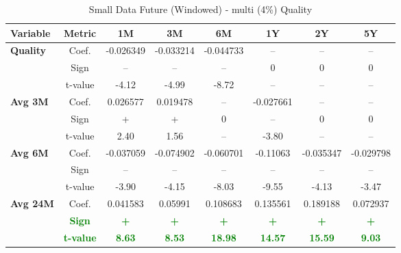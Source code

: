 \documentclass[11pt,english,a4paper,hidelinks]{book}
\begin{document}
\begin{table}[H]
    \centering
    \begin{tabular}{lccccccc}
        \toprule
        \textbf{Variable} & \textbf{Metric} & \textbf{1M} & \textbf{3M} & \textbf{6M} & \textbf{1Y} & \textbf{2Y} & \textbf{5Y} \\
        \midrule
        \multirow{3}{*}{\textbf{Quality}}
            & Coef.   & -0.026349 & -0.033214 & -0.044733 & --        & --        & --        \\
            & Sign    & –         & –         & –         & 0         & 0         & 0         \\
            & t-value & -4.12     & -4.99     & -8.72     & --        & --        & --        \\
        \cmidrule{1-8}
        \multirow{3}{*}{\textbf{Avg 3M}}
            & Coef.   & 0.026577  & 0.019478  & --        & -0.027661 & --        & --        \\
            & Sign    & +         & +         & 0         & –         & 0         & 0         \\
            & t-value & 2.40      & 1.56      & --        & -3.80     & --        & --        \\
        \cmidrule{1-8}
        \multirow{3}{*}{\textbf{Avg 6M}}
            & Coef.   & -0.037059 & -0.074902 & -0.060701 & -0.11063  & -0.035347 & -0.029798 \\
            & Sign    & –         & –         & –         & –         & –         & –         \\
            & t-value & -3.90     & -4.15     & -8.03     & -9.55     & -4.13     & -3.47     \\
        \cmidrule{1-8}
        \multirow{3}{*}{\textbf{Avg 24M}}
            & Coef.   & 0.041583  & 0.05991   & 0.108683  & 0.135561  & 0.189188  & 0.072937  \\
            & \textbf{\textcolor{green}{Sign}}
                     & \textbf{\textcolor{green}{+}}
                     & \textbf{\textcolor{green}{+}}
                     & \textbf{\textcolor{green}{+}}
                     & \textbf{\textcolor{green}{+}}
                     & \textbf{\textcolor{green}{+}}
                     & \textbf{\textcolor{green}{+}} \\
            & \textbf{\textcolor{green}{t-value}}
                     & \textbf{\textcolor{green}{8.63}}
                     & \textbf{\textcolor{green}{8.53}}
                     & \textbf{\textcolor{green}{18.98}}
                     & \textbf{\textcolor{green}{14.57}}
                     & \textbf{\textcolor{green}{15.59}}
                     & \textbf{\textcolor{green}{9.03}} \\
        
        \bottomrule
    \end{tabular}
    \caption{Small Data Future (Windowed) - \acrshort{multi} (4\%) Quality}
    \label{tab:quality_windowed_reformat}
\end{table}
\end{document}
